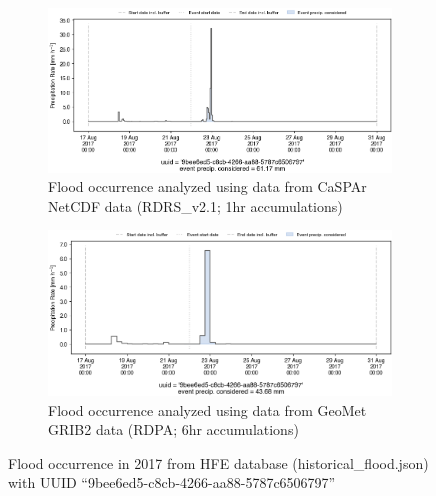 \documentclass[10pt,a4paper,titlepage,parskip]{scrartcl}
\begin{document}
\begin{figure}[h]
	\begin{subfigure}[a]{1.0\textwidth}
		\centering
		\includegraphics[width=\linewidth]{figures/compare_Geomet_CaSPAr/interpolated_at_stations_occurrence_1686_identified-timesteps_RDRS_v2.1.png}
		\caption{Flood occurrence analyzed using data from CaSPAr NetCDF data (RDRS\_v2.1; 1hr accumulations)}
	\end{subfigure}
	\par\bigskip\bigskip
	\begin{subfigure}[b]{1.0\textwidth}
		\centering
		\includegraphics[width=\linewidth]{figures/compare_Geomet_CaSPAr/interpolated_at_stations_occurrence_1686_identified-timesteps_rdpa:10km:6f.png}
		\caption{Flood occurrence analyzed using data from GeoMet GRIB2 data (RDPA; 6hr accumulations)}
	\end{subfigure}
	\par\bigskip\bigskip
	\caption{Flood occurrence in 2017 from HFE database (historical\_flood.json) with UUID ``9bee6ed5-c8cb-4266-aa88-5787c6506797''}
\end{figure}
\pagebreak
\end{document}
